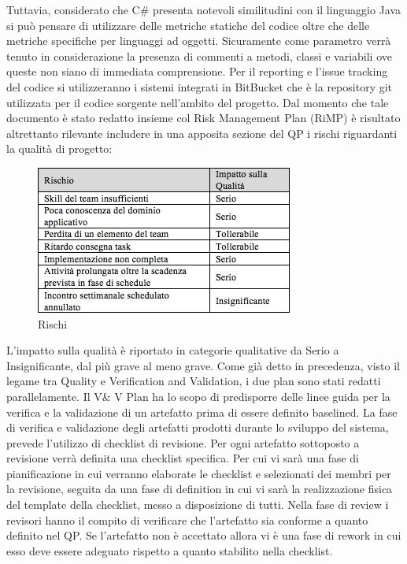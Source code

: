 Tuttavia, considerato che C\# presenta notevoli similitudini con il linguaggio Java si pu\`{o} pensare di utilizzare delle metriche statiche del codice oltre che delle metriche specifiche per linguaggi ad oggetti.
Sicuramente come parametro verr\`{a} tenuto in considerazione la presenza di commenti a metodi, classi e variabili ove queste non siano di immediata comprensione.
Per il reporting e l\rq issue tracking del codice si utilizzeranno i sistemi integrati in BitBucket che \`{e} la repository git utilizzata per il codice sorgente nell\rq ambito del progetto.
Dal momento che tale documento \`{e} stato redatto insieme col Risk Management Plan (RiMP) \`{e} risultato altrettanto rilevante includere in una apposita sezione del QP i rischi riguardanti la qualit\`{a} di progetto:
\begin{figure}[h]
\centering
\includegraphics[scale=.7]{img/12.png}
\caption{Rischi}
\label{fig:cd}
\end{figure}
L\rq impatto sulla qualit\`{a} \`{e} riportato in categorie qualitative da Serio a Insignificante, dal pi\`{u} grave al meno grave.
Come gi\`{a} detto in precedenza, visto il legame tra Quality e Verification and Validation, i due plan sono stati redatti parallelamente.
Il V\& V Plan ha lo scopo di predisporre delle linee guida per la verifica e la validazione di un artefatto prima di essere definito baselined.
La fase di verifica e validazione degli artefatti prodotti durante lo sviluppo del sistema, prevede l\rq utilizzo di checklist di revisione. Per ogni artefatto sottoposto a revisione verr\`{a} definita una checklist specifica. 
Per cui vi sar\`{a} una fase di pianificazione in cui verranno elaborate le checklist e selezionati dei membri per la revisione, seguita da una fase di definition in cui vi sar\`{a} la realizzazione fisica del template della checklist, messo a disposizione di tutti.
Nella fase di review i revisori hanno il compito di verificare che l\rq artefatto sia conforme a quanto definito nel QP.
Se l\rq artefatto non \`{e} accettato allora vi \`{e} una fase di rework in cui esso deve essere adeguato rispetto a quanto stabilito nella checklist.
